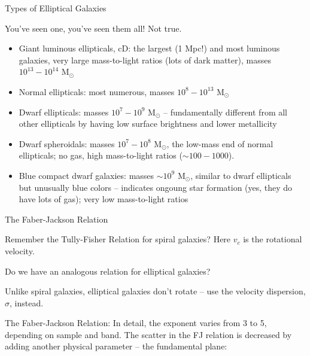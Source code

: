 \documentclass[letterpaper,landscape]{slides}
\begin{document}
\begin{slide}
\begin{center}
{\color{red} Types of Elliptical Galaxies}
\end{center}


{\color{blue} You've seen one, you've seen them all!} {\color{red} Not true.}


\begin{itemize}
\item {\color{blue}Giant luminous ellipticals, cD:} the largest (1 Mpc!) and most luminous galaxies,
      very large mass-to-light ratios (lots of dark matter), masses $10^{13}-10^{14}$ M$_\odot$
\item {\color{blue}Normal ellipticals:} most numerous, masses $10^{8}-10^{13}$ M$_\odot$
\item {\color{blue}Dwarf ellipticals:} masses $10^{7}-10^{9}$ M$_\odot$ -- fundamentally different from all 
 other ellipticals by having low surface brightness and lower metallicity
\item {\color{blue}Dwarf spheroidals:} masses $10^{7}-10^{8}$ M$_\odot$, the low-mass end of normal ellipticals; no gas, high mass-to-light ratios ($\sim 100-1000$).
\item {\color{blue}Blue compact dwarf galaxies:} masses $\sim10^{9}$ M$_\odot$, similar to dwarf ellipticals
     but unusually blue colors -- indicates ongoung star formation (yes, they do have lots of
     gas); very low mass-to-light ratios
\end{itemize}



\vfill
\end{slide}




\begin{slide}
\begin{center}
{\large \color{red} 
           The Faber-Jackson Relation }
\end{center}

Remember the Tully-Fisher Relation for spiral galaxies?
Here $v_c$ is the {\color{red} rotational} velocity. 

Do we have an analogous relation for elliptical galaxies? 

Unlike spiral galaxies, {\color{red} elliptical galaxies don't rotate} -- 
use the velocity dispersion, $\sigma$, instead.

The Faber-Jackson Relation:
In detail, the exponent varies from 3 to 5, depending on sample
and band. The scatter in the FJ relation is decreased by adding another physical parameter --
{\color{red} the fundamental plane}:



\vfill
\end{slide}
\end{document}
